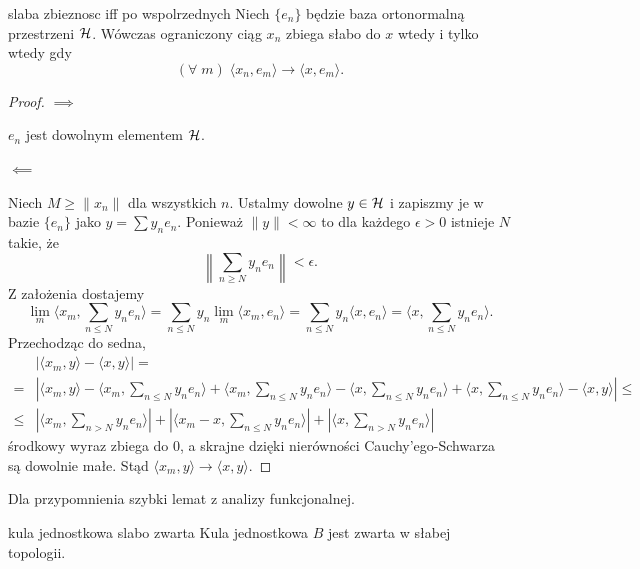 \begin{lemma}{}{slaba zbieznosc iff po wspolrzednych}
  Niech $\{e_n\}$ będzie baza ortonormalną przestrzeni $\operatorname{\mathcal{H}}$. Wówczas ograniczony ciąg $x_n$ zbiega słabo do $x$ wtedy i tylko wtedy gdy
  $$(\forall\;m)\;\langle x_n, e_m\rangle \to \langle x, e_m\rangle.$$
\end{lemma}

\begin{proof}
  $\implies$ 

  $e_n$ jest dowolnym elementem $\operatorname{\mathcal{H}}$. 

  $\impliedby$

  Niech $M\geq\|x_n\|$ dla wszystkich $n$. Ustalmy dowolne $y\in \operatorname{\mathcal{H}}$ i zapiszmy je w bazie $\{e_n\}$ jako $y=\sum y_ne_n$. Ponieważ $\|y\|<\infty$ to dla każdego $\epsilon>0$ istnieje $N$ takie, że 
  $$\left \|\sum_{n\geq N} y_n e_n \right \|<\epsilon.$$
  Z założenia dostajemy
  $$\lim_m \langle x_m, \sum_{n\leq N} y_ne_n\rangle=\sum_{n\leq N}y_n\lim_m \langle x_m, e_n\rangle=\sum_{n\leq N}y_n\langle x, e_n\rangle=\langle x, \sum_{n\leq N}y_ne_n\rangle.$$
  Przechodząc do sedna,
  \begin{align*}
    &|\langle x_m, y\rangle-\langle x, y\rangle|=\\ 
    =&|\langle x_m, y\rangle-\langle x_m, \sum_{n\leq N}y_ne_n\rangle+\langle x_m, \sum_{n\leq N}y_ne_n\rangle-\langle x, \sum_{n\leq N}y_ne_n\rangle+\langle x, \sum_{n\leq N}y_ne_n\rangle-\langle x, y\rangle|\leq \\ 
    \leq& |\langle x_m, \sum_{n> N}y_ne_n\rangle|+|\langle x_m-x, \sum_{n\leq N}y_ne_n\rangle|+|\langle x, \sum_{n>N}y_ne_n\rangle|
  \end{align*}
  środkowy wyraz zbiega do $0$, a skrajne dzięki nierówności Cauchy'ego-Schwarza są dowolnie małe. Stąd $\langle x_m, y\rangle\to\langle x, y\rangle$.
\end{proof}

Dla przypomnienia szybki lemat z analizy funkcjonalnej.

\begin{lemma}{}{kula jednostkowa slabo zwarta}
  Kula jednostkowa $B$ jest zwarta w słabej topologii.
\end{lemma}

